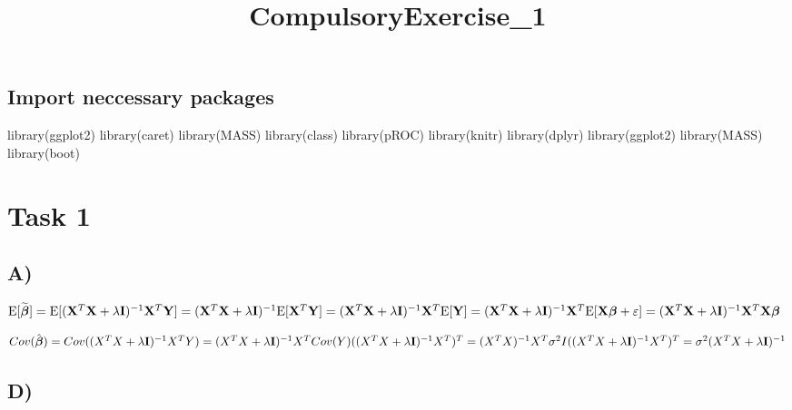 \documentclass[
]{article}
\title{CompulsoryExercise\_1}
\author{}
\date{\vspace{-2.5em}}
\newenvironment{Shaded}{\begin{snugshade}}{\end{snugshade}}
\newcommand{\FunctionTok}[1]{\textcolor[rgb]{0.00,0.00,0.00}{#1}}
\newcommand{\NormalTok}[1]{#1}
\begin{document}
\maketitle

\hypertarget{import-neccessary-packages}{%
\subsection{Import neccessary
packages}\label{import-neccessary-packages}}

\begin{Shaded}
\begin{Highlighting}[]
\FunctionTok{library}\NormalTok{(ggplot2)}
\FunctionTok{library}\NormalTok{(caret)}
\FunctionTok{library}\NormalTok{(MASS)}
\FunctionTok{library}\NormalTok{(class)}
\FunctionTok{library}\NormalTok{(pROC)}
\FunctionTok{library}\NormalTok{(knitr)}
\FunctionTok{library}\NormalTok{(dplyr)}
\FunctionTok{library}\NormalTok{(ggplot2)}
\FunctionTok{library}\NormalTok{(MASS)}
\FunctionTok{library}\NormalTok{(boot)}
\end{Highlighting}
\end{Shaded}

\hypertarget{task-1}{%
\section{Task 1}\label{task-1}}

\hypertarget{a}{%
\subsection{A)}\label{a}}

\(\text{E}[\widetilde{\boldsymbol{\beta}}]=\text{E}[(\mathbf{X}^T\mathbf{X}+\lambda \mathbf{I})^{-1}\mathbf{X}^T{\bf Y}]=(\mathbf{X}^T\mathbf{X}+\lambda \mathbf{I})^{-1}\text{E}[\mathbf{X}^T{\bf Y}]=(\mathbf{X}^T\mathbf{X}+\lambda \mathbf{I})^{-1}\mathbf{X}^T\text{E}[{\bf Y}]=(\mathbf{X}^T\mathbf{X}+\lambda \mathbf{I})^{-1}\mathbf{X}^T\text{E}[\mathbf{X}\boldsymbol{\beta}+\varepsilon]=(\mathbf{X}^T\mathbf{X}+\lambda \mathbf{I})^{-1}\mathbf{X}^T\mathbf{X}\boldsymbol{\beta}\)

\(Cov(\hat{\boldsymbol\beta})=Cov((X^T X+\lambda\mathbf{I})^{-1}X^T Y)=(X^TX+\lambda\mathbf{I})^{-1}X^T Cov(Y)((X^TX+\lambda\mathbf{I})^{-1}X^T)^T=(X^TX)^{-1}X^T \sigma^2 I ((X^TX+\lambda\mathbf{I})^{-1}X^T)^T=\sigma^2 (X^TX+\lambda\mathbf{I})^{-1} \\\)

\hypertarget{d}{%
\subsection{D)}\label{d}}
\end{document}

